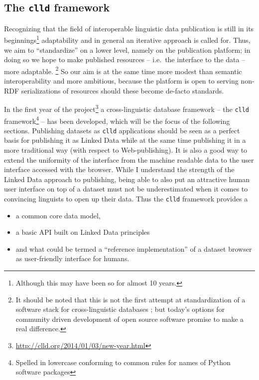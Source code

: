 \documentclass[a4paper,10pt]{article}
\begin{document}
\subsection{The \texttt{clld} framework}
Recognizing that the field of interoperable linguistic data publication is still in its
beginnings\footnote{Although this may have been so for almost 10 years.} adaptability and in general an
iterative approach is called for. Thus, we aim to ``standardize'' on a lower
level, namely on the publication platform; in doing so we hope to make published
resources -- i.e.~the interface to the data -- more adaptable.%
\footnote{It should be noted that this is not the first attempt at standardization of a software stack for cross-linguistic databases \cite{dimitriadis2002}; but today's options for community driven development of open source software promise to make a real difference.}
So our aim is at the same time more modest than
semantic interoperability and more ambitious, because the platform is open to serving non-RDF serializations
of resources should these become de-facto standards.

In the first year of the project\footnote{\url{http://clld.org/2014/01/03/new-year.html}} a cross-linguistic database framework -- the \texttt{clld} framework\footnote{Spelled in lowercase conforming to common rules for names of Python software packages} -- has been
developed, which will be the focus of the following sections.
Publishing datasets as \texttt{clld} applications should be seen as a perfect basis for publishing it as Linked Data while at the same time publishing it in a more traditional way (with respect to Web-publishing). It is also a good way to extend the uniformity of the interface from the machine readable data to the user interface accessed with the browser.
While I understand the strength of the Linked Data approach to publishing, being able to also put an attractive human user interface on top of a dataset must not be underestimated when it comes to convincing linguists to open up their data.
Thus the \texttt{clld} framework provides a
\begin{itemize}
\item a common core data model,
\item a basic API built on Linked Data principles
\item and what could be termed a ``reference implementation'' of a dataset browser as user-friendly
interface for humans.
\end{itemize}
\end{document}
